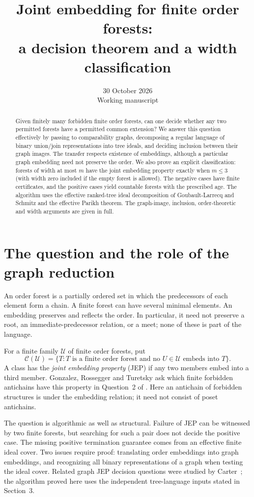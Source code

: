 \documentclass[11pt]{article}
\title{Joint embedding for finite order forests:\\a decision theorem and a width classification}
\author{}
\date{30 October 2026\\Working manuscript}
\begin{document}
\maketitle
\begin{abstract}
Given finitely many forbidden finite order forests, can one decide whether
any two permitted forests have a permitted common extension? We answer
this question effectively by passing to comparability graphs, decomposing
a regular language of binary union/join representations into tree ideals,
and deciding inclusion between their graph images. The transfer respects existence of embeddings,
although a particular graph embedding need not preserve the order.
We also prove an explicit classification: forests of width at most $m$
have the joint embedding property exactly when $m\leq3$ (with width zero
included if the empty forest is allowed). The negative cases have finite
certificates, and the positive cases yield countable forests with the
prescribed age. The algorithm uses the effective ranked-tree ideal
decomposition of Goubault-Larrecq and Schmitz and the effective Parikh
theorem. The graph-image, inclusion, order-theoretic and width arguments
are given in full.
\end{abstract}

\section{The question and the role of the graph reduction}
An order forest is a partially ordered set in which the predecessors of
each element form a chain. A finite forest can have several minimal
elements. An embedding preserves and reflects the order. In particular,
it need not preserve a root, an immediate-predecessor relation, or a meet;
none of these is part of the language.

For a finite family $\mathcal U$ of finite order forests, put
\[
 \mathcal C(\mathcal U)=\{T:T\text{ is a finite order forest and no }
 U\in\mathcal U\text{ embeds into }T\}.
\]
A class has the \emph{joint embedding property} (JEP) if any two members
embed into a third member. Gonzalez, Rossegger and Turetsky ask which
finite forbidden antichains have this property in Question~2 of
\cite{GRT}. Here an antichain of forbidden structures is under the
embedding relation; it need not consist of poset antichains.

The question is algorithmic as well as structural. Failure of JEP can
be witnessed by two finite forests, but searching for such a pair does
not decide the positive case. The missing positive termination guarantee
comes from an effective finite ideal cover. Two issues require proof:
translating order embeddings into graph embeddings, and recognizing all
binary representations of a graph when testing the ideal cover. Related
graph JEP decision questions were studied by Carter~\cite{Carter}; the
algorithm proved here uses the independent tree-language inputs stated
in Section~3.
\end{document}
